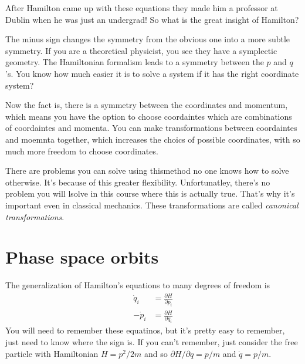 After Hamilton came up with these equations they made him a professor at Dublin
when he was just an undergrad!
So what is the great insight of Hamilton?

The minus sign changes the symmetry from the obvious one into a more subtle
symmetry.
If you are a theoretical physicist,
you see they have a symplectic geometry.
The Hamiltonian formalism leads to a symmetry between the $p$ and $q$'s.
You know how much easier it is to solve a system if it has the right coordinate
system?

Now the fact is,
there is a symmetry between the coordinates and momentum,
which means you have the option to choose coordaintes which are combinations of
coordaintes and momenta.
You can make transformations between coordaintes and moemnta together,
which increases the choics of possible coordinates,
with so much more freedom to choose coordinates.

There are problems you can solve using thismethod no one knows how to solve
otherwise.
It's because of this greater flexibility.
Unfortunatley,
there's no problem you will lsolve in this course where this is actually true.
That's why it's important even in classical mechanics.
These transformations are called \emph{canonical transformations}.

\section{Phase space orbits}
The generalization of Hamilton's equations to many degrees of freedom is
\begin{align}
    \dot{q}_i &= \frac{\partial H}{\partial p_i}\\
    -\dot{p}_i &= \frac{\partial H}{\partial q_i}
\end{align}
You will need to remember these equatinos,
but it's pretty easy to remember,
just need to know where the sign is.
If you can't remember,
just consider the free particle with Hamiltonian
$H=p^2/2m$ and so $\partial H/\partial q = p/m$ and $\dot{q}=p/m$.

